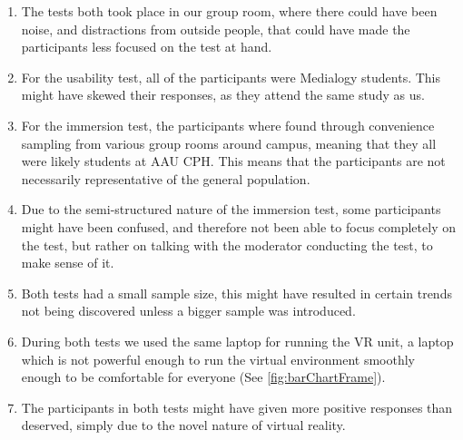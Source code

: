	\begin{enumerate}
		\item The tests both took place in our group room, where there could have been noise, and distractions from outside people, that could have made the participants less focused on the test at hand.\\
		
		\item For the usability test, all of the participants were Medialogy students. This might have skewed their responses, as they attend the same study as us.\\
		
		\item For the immersion test, the participants where found through convenience sampling from various group rooms around campus, meaning that they all were likely students at AAU CPH. This means that the participants are not necessarily representative of the general population.\\
		
		\item Due to the semi-structured nature of the immersion test, some participants might have been confused, and therefore not been able to focus completely on the test, but rather on talking with the moderator conducting the test, to make sense of it.\\
		
		\item Both tests had a small sample size, this might have resulted in certain trends not being discovered unless a bigger sample was introduced.\\
		
		\item During both tests we used the same laptop for running the VR unit, a laptop which is not powerful enough to run the virtual environment smoothly enough to be comfortable for everyone (See \autoref{fig:barChartFrame}).\\
		
		\item The participants in both tests might have given more positive responses than deserved, simply due to the novel nature of virtual reality. 
		
	\end{enumerate}

